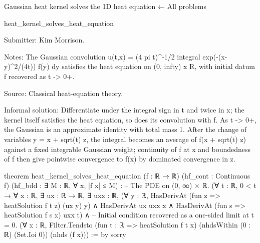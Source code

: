 Gaussian heat kernel solves the 1D heat equation
← All problems

heat_kernel_solves_heat_equation

Submitter: Kim Morrison.

Notes: The Gaussian convolution u(t,x) = (4 pi t)^{-1/2} integral exp(-(x-y)^2/(4t)) f(y) dy satisfies the heat equation on (0, infty) x R, with initial datum f recovered as t -> 0+.

Source: Classical heat-equation theory.

Informal solution: Differentiate under the integral sign in t and twice in x; the kernel itself satisfies the heat equation, so does its convolution with f. As t -> 0+, the Gaussian is an approximate identity with total mass 1. After the change of variables y = x + sqrt(t) z, the integral becomes an average of f(x + sqrt(t) z) against a fixed integrable Gaussian weight; continuity of f at x and boundedness of f then give pointwise convergence to f(x) by dominated convergence in z.

theorem heat_kernel_solves_heat_equation (f : ℝ → ℝ) (hf_cont : Continuous f) (hf_bdd : ∃ M : ℝ, ∀ x, |f x| ≤ M) :
    -- The PDE on (0, ∞) × ℝ.
    (∀ t : ℝ, 0 < t → ∀ x : ℝ, ∃ ux : ℝ → ℝ, ∃ uxx : ℝ,
        (∀ y : ℝ, HasDerivAt (fun z => heatSolution f t z) (ux y) y) ∧
        HasDerivAt ux uxx x ∧
        HasDerivAt (fun s => heatSolution f s x) uxx t) ∧
    -- Initial condition recovered as a one-sided limit at t = 0.
    (∀ x : ℝ,
        Filter.Tendsto (fun t : ℝ => heatSolution f t x)
          (nhdsWithin (0 : ℝ) (Set.Ioi 0)) (nhds (f x))) := by
  sorry